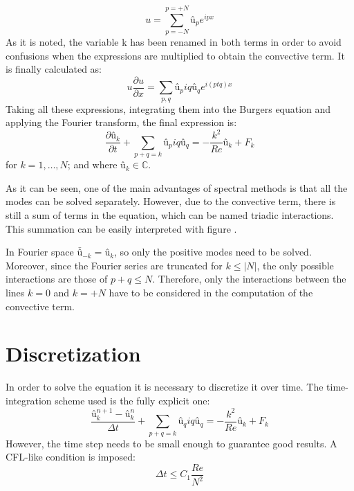 \begin{equation}
u=\sum_{p=-N}^{p=+N}û_{p}e^{ipx}
\end{equation}
As it is noted, the variable k has been renamed in both terms in order to avoid confusions when the expressions are multiplied to obtain the convective term. It is finally calculated as:
\begin{equation}
u\frac{\partial u}{\partial x}=\sum_{p,q}û_{p}iqû_{q}e^{i\left(ptq\right)x}
\end{equation}
Taking all these expressions, integrating them into the Burgers equation and applying the Fourier transform, the final expression is:
\begin{equation}
\frac{\partial û_{k}}{\partial t}+\sum_{p+q=k}û_{p}iqû_{q}=-\frac{k^{2}}{Re}û_{k}+F_{k}
\end{equation}
for $k=1,\dots, N$; and where $û_{k}\in\mathbb{C}$.

As it can be seen, one of the main advantages of spectral methods is that all the modes can be solved separately. However, due to the convective term, there is still a sum of terms in the equation, which can be named triadic interactions. This summation can be easily interpreted with figure .

In Fourier space $\bar{û}_{-k}=û_{k}$, so only the positive modes need to be solved. Moreover, since the Fourier series are truncated for $k≤|N|$, the only possible interactions are those of $p+q≤N$. Therefore, only the interactions between the lines $k=0$ and $k=+N$ have to be considered in the computation of the convective term.

\section{Discretization}
In order to solve the equation it is necessary to discretize it over time. The time-integration scheme used is the fully explicit one:
\begin{equation}
\frac{û_{k}^{n+1}-û_{k}^{n}}{\Delta t}+\sum_{p+q=k}û_{q}iqû_{q}=-\frac{k^{2}}{Re}û_{k}+F_{k}
\end{equation}
However, the time step needs to be small enough to guarantee good results. A CFL-like condition is imposed:
\begin{equation}
\Delta t\leq C_{1}\frac{Re}{N^{2}}
\end{equation}

